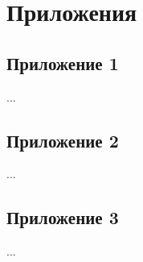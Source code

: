 \documentclass[../thesis.tex]{subfiles}
\begin{document}
\section*{Приложения} \label{section:annex}



\subsection*{Приложение 1}

...

\newpage



\subsection*{Приложение 2}

...

\newpage



\subsection*{Приложение 3}

...
\end{document}
